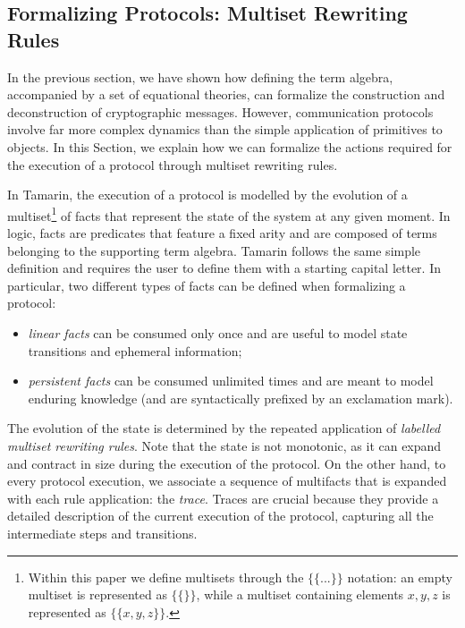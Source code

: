 \subsection{Formalizing Protocols: Multiset Rewriting Rules}
\label{sec:formalizingprotocols}
In the previous section, we have shown how defining the term algebra, accompanied by a set of equational theories, can formalize the construction and deconstruction of cryptographic messages. However, communication protocols involve far more complex dynamics than the simple application of primitives to objects. In this Section, we explain how we can formalize the actions required for the execution of a protocol through multiset rewriting rules.

In Tamarin, the execution of a protocol is modelled by the evolution of a multiset\footnote{Within this paper we define multisets through the $\{\{ ... \}\}$ notation: an empty multiset is represented as $\{\{\}\}$, while a multiset containing elements $x,y,z$ is represented as $\{\{x,y,z\}\}.$} of facts that represent the state of the system at any given moment. In logic, facts are predicates that feature a fixed arity and are composed of terms belonging to the supporting term algebra. Tamarin follows the same simple definition and requires the user to define them with a starting capital letter. In particular, two different types of facts can be defined when formalizing a protocol:

\begin{itemize}
    \item \textit{linear facts} can be consumed only once and are useful to model state transitions and ephemeral information;
    \item \textit{persistent facts} can be consumed unlimited times and are meant to model enduring knowledge (and are syntactically prefixed by an exclamation mark).
\end{itemize}

The evolution of the state is determined by the repeated application of \textit{labelled multiset rewriting rules}. Note that the state is not monotonic, as it can expand and contract in size during the execution of the protocol. On the other hand, to every protocol execution, we associate a sequence of multifacts that is expanded with each rule application: the \textit{trace}. Traces are crucial because they provide a detailed description of the current execution of the protocol, capturing all the intermediate steps and transitions.

